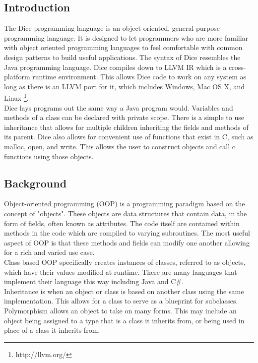 \begin{homeworkProblem}
	\chapter{Introduction}
	The Dice programming language is an object-oriented, general purpose programming language. It is designed to let programmers who are more familiar with object oriented programming languages to feel comfortable with common design patterns to build useful applications. The syntax of Dice resembles the Java programming language. Dice compiles down to LLVM IR which is a cross-platform runtime environment. This allows Dice code to work on any system as long as there is an LLVM port for it, which includes Windows, Mac OS X, and Linux \footnote{http://llvm.org/}.\\
	
	Dice lays programs out the same way a Java program would. Variables and methods of a class can be declared with private scope. There is a simple to use inheritance that allows for multiple children inheriting the fields and methods of its parent. Dice also allows for convenient use of functions that exist in C, such as malloc, open, and write. This allows the user to construct objects and call c functions using those objects. 
	
	\section{Background}
	Object-oriented programming (OOP) is a programming paradigm based on the concept of "objects". These objects are data structures that contain data, in the form of fields, often known as attributes. The code itself are contained within methods in the code which are compiled to varying subroutines. The most useful aspect of OOP is that these methods and fields can modify one another allowing for a rich and varied use case. \\
	
	Class based OOP specifically creates instances of classes, referred to as objects, which have their values modified at runtime. There are many languages that implement their language this way including Java and C\#. \\
	
	Inheritance is when an object or class is based on another class using the same implementation. This allows for a class to serve as a blueprint for subclasses. Polymorphism allows an object to take on many forms. This may include an object being assigned to a type that is a class it inherits from, or being used in place of a class it inherits from. \\
	

\end{homeworkProblem}
